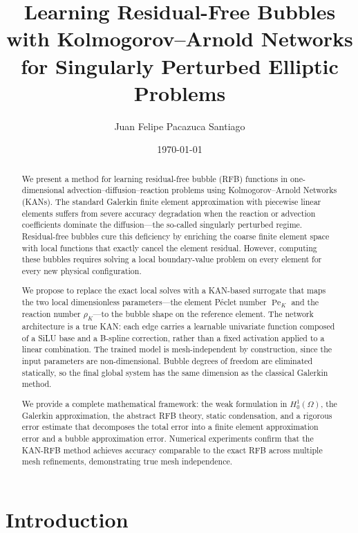 \documentclass[11pt]{article}
\title{Learning Residual-Free Bubbles with Kolmogorov--Arnold Networks for Singularly Perturbed Elliptic Problems}
\author{Juan Felipe Pacazuca Santiago}
\date{\today}
\newcommand{\Pe}{\operatorname{Pe}}
\theoremstyle{remark}
\begin{document}
\maketitle

\begin{abstract}
We present a method for learning residual-free bubble (RFB) functions in one-dimensional advection--diffusion--reaction problems using Kolmogorov--Arnold Networks (KANs). The standard Galerkin finite element approximation with piecewise linear elements suffers from severe accuracy degradation when the reaction or advection coefficients dominate the diffusion---the so-called singularly perturbed regime. Residual-free bubbles cure this deficiency by enriching the coarse finite element space with local functions that exactly cancel the element residual. However, computing these bubbles requires solving a local boundary-value problem on every element for every new physical configuration.

We propose to replace the exact local solves with a KAN-based surrogate that maps the two local dimensionless parameters---the element P\'{e}clet number $\Pe_K$ and the reaction number $\rho_K$---to the bubble shape on the reference element. The network architecture is a true KAN: each edge carries a learnable univariate function composed of a SiLU base and a B-spline correction, rather than a fixed activation applied to a linear combination. The trained model is mesh-independent by construction, since the input parameters are non-dimensional. Bubble degrees of freedom are eliminated statically, so the final global system has the same dimension as the classical Galerkin method.

We provide a complete mathematical framework: the weak formulation in $H^1_0(\Omega)$, the Galerkin approximation, the abstract RFB theory, static condensation, and a rigorous error estimate that decomposes the total error into a finite element approximation error and a bubble approximation error. Numerical experiments confirm that the KAN-RFB method achieves accuracy comparable to the exact RFB across multiple mesh refinements, demonstrating true mesh independence.
\end{abstract}

\section{Introduction}
\label{sec:introduction}
\end{document}
